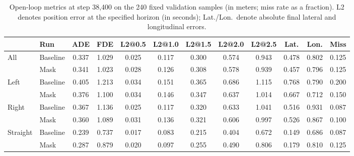 \begin{table}[!htb]
\centering\scriptsize
\caption{Open-loop metrics at step 38{,}400 on the 240 fixed validation samples (in meters; miss rate as a fraction). L2 denotes position error at the specified horizon (in seconds); Lat./Lon.\ denote absolute final lateral and longitudinal errors.}
\label{tab:app_open}
\begin{tabular}{llcccccccccc}
\toprule
 & Run & ADE & FDE & L2@0.5 & L2@1.0 & L2@1.5 & L2@2.0 & L2@2.5 & Lat. & Lon. & Miss \\
\midrule
All & Baseline & 0.337 & 1.029 & 0.025 & 0.117 & 0.300 & 0.574 & 0.943 & 0.478 & 0.802 & 0.125 \\
 & Mask & 0.341 & 1.023 & 0.028 & 0.126 & 0.308 & 0.578 & 0.939 & 0.457 & 0.796 & 0.125 \\
\midrule
Left & Baseline & 0.405 & 1.213 & 0.034 & 0.151 & 0.365 & 0.686 & 1.115 & 0.768 & 0.790 & 0.200 \\
 & Mask & 0.376 & 1.100 & 0.034 & 0.146 & 0.347 & 0.637 & 1.014 & 0.667 & 0.712 & 0.150 \\
\midrule
Right & Baseline & 0.367 & 1.136 & 0.025 & 0.117 & 0.320 & 0.633 & 1.041 & 0.516 & 0.931 & 0.087 \\
 & Mask & 0.360 & 1.089 & 0.031 & 0.136 & 0.321 & 0.606 & 0.997 & 0.526 & 0.867 & 0.100 \\
\midrule
Straight & Baseline & 0.239 & 0.737 & 0.017 & 0.083 & 0.215 & 0.404 & 0.672 & 0.149 & 0.686 & 0.087 \\
 & Mask & 0.287 & 0.879 & 0.020 & 0.097 & 0.255 & 0.490 & 0.806 & 0.179 & 0.810 & 0.125 \\
\bottomrule
\end{tabular}
\end{table}


